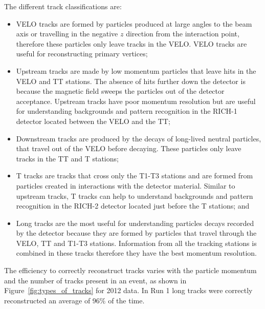 The different track classifications are:
\begin{itemize}
\item  VELO tracks are formed by particles produced at large angles to the beam axis or travelling in the negative $z$ direction from the interaction point, therefore these particles only leave tracks in the VELO. VELO tracks are useful for reconstructing primary vertices;  
\item Upstream tracks are made by low momentum particles that leave hits in the VELO and TT stations. The absence of hits further down the detector is because the magnetic field sweeps the particles out of the detector acceptance. Upstream tracks have poor momentum resolution but are useful for understanding backgrounds and pattern recognition in the RICH-1 detector located between the VELO and the TT;
\item Downstream tracks are produced by the decays of long-lived neutral particles, that travel out of the VELO before decaying. These particles only leave tracks in the TT and T stations; 
\item T tracks are tracks that cross only the T1-T3 stations and are formed from particles created in interactions with the detector material. Similar to upstream tracks, T tracks can help to understand backgrounds and pattern recognition in the RICH-2 detector located just before the T stations; and
\item Long tracks are the most useful for understanding particles decays recorded by the detector because they are formed by particles that travel through the VELO, TT and T1-T3 stations. Information from all the tracking stations is combined in these tracks therefore they have the best momentum resolution.
\end{itemize}



The efficiency to correctly reconstruct tracks varies with the particle momentum and the number of tracks present in an event, as shown in Figure~\ref{fig:types_of_tracks} for 2012 data. In Run 1 long tracks were correctly reconstructed an average of 96$\%$ of the time.





